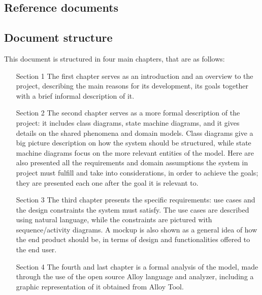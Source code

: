 \subsection{Reference documents}
\subsection{Document structure}
This document is structured in four main chapters, that are as follows:
\begin{enumerate}
	\item[Section 1] The first chapter serves as an introduction and an overview to the project, describing the main reasons for its development, its goals together with a brief informal description of it.

	\item[Section 2] The second chapter serves as a more formal description of the project: it includes class diagrams, state machine diagrams, and it gives details on the shared phenomena and domain models. Class diagrams give a big picture description on how the system should be structured, while state machine diagrams focus on the more relevant entities of the model. Here are also presented all the requirements and domain assumptions the system in project must fulfill and take into considerations, in order to achieve the goals; they are presented each one after the goal it is relevant to.

	\item[Section 3] The third chapter presents the specific requirements: use cases and the design constraints the system must satisfy. The use cases are described using natural language, while the constraints are pictured with sequence/activity diagrams. A mockup is also shown as a general idea of how the end product should be, in terms of design and functionalities offered to the end user.

	\item[Section 4] The fourth and last chapter is a formal analysis of the model, made through the use of the open source Alloy language and analyzer, including a graphic representation of it obtained from Alloy Tool.
\end{enumerate}
